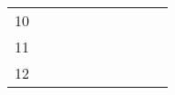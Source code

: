 \begin{table}[ht]
\begin{tabular}{c|lllllllll}
    10                                                                                                         &                                                                              &                                                          &                                                           &                                                                &                                                                  &                                                                                                                 &                                                                                                                &                                                                                                                                &                                                            \\
    11                                                                                                         &                                                                              &                                                          &                                                           &                                                                &                                                                  &                                                                                                                 &                                                                                                                &                                                                                                                                &                                                            \\
    12                                                                                                         &                                                                              &                                                          &                                                           &                                                                &                                                                  &                                                                                                                 &                                                                                                                &                                                                                                                                &                                                            \\

\end{tabular}
\end{table}
